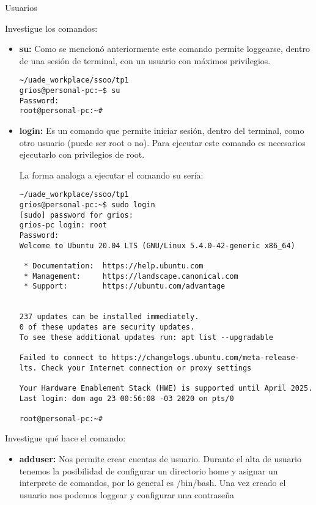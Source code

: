 \begin{section}{Usuarios}
\begin{itemize}
\end{itemize}


\begin{quoting}
Investigue los comandos:
\end{quoting}


\begin{itemize}
\item \textbf{su:}
Como se mencionó anteriormente este comando permite loggearse, dentro de una sesión de terminal, con un usuario con máximos privilegios.

\begin{lstlisting}[style=Ubuntu]
~/uade_workplace/ssoo/tp1
grios@personal-pc:~$ su
Password: 
root@personal-pc:~#
\end{lstlisting}

\item \textbf{login:}
Es un comando que permite iniciar sesión, dentro del terminal, como otro usuario (puede ser root o no). Para ejecutar este comando es necesarios ejecutarlo con privilegios de root.

La forma analoga a ejecutar el comando su sería:
\begin{lstlisting}[style=Ubuntu]
~/uade_workplace/ssoo/tp1
grios@personal-pc:~$ sudo login
[sudo] password for grios: 
grios-pc login: root
Password: 
Welcome to Ubuntu 20.04 LTS (GNU/Linux 5.4.0-42-generic x86_64)

 * Documentation:  https://help.ubuntu.com
 * Management:     https://landscape.canonical.com
 * Support:        https://ubuntu.com/advantage


237 updates can be installed immediately.
0 of these updates are security updates.
To see these additional updates run: apt list --upgradable

Failed to connect to https://changelogs.ubuntu.com/meta-release-lts. Check your Internet connection or proxy settings

Your Hardware Enablement Stack (HWE) is supported until April 2025.
Last login: dom ago 23 00:56:08 -03 2020 on pts/0

root@personal-pc:~# 
\end{lstlisting}
\end{itemize}


\begin{quoting}
Investigue qué hace el comando:
\end{quoting}

\begin{itemize}

\item \textbf{adduser:}
	Nos permite crear cuentas de usuario. Durante el alta de usuario tenemos la posibilidad de configurar un directorio home y asignar un interprete de comandos, por lo general es /bin/bash. Una vez creado el usuario nos podemos loggear y configurar una contraseña


\end{itemize}
\end{section}
